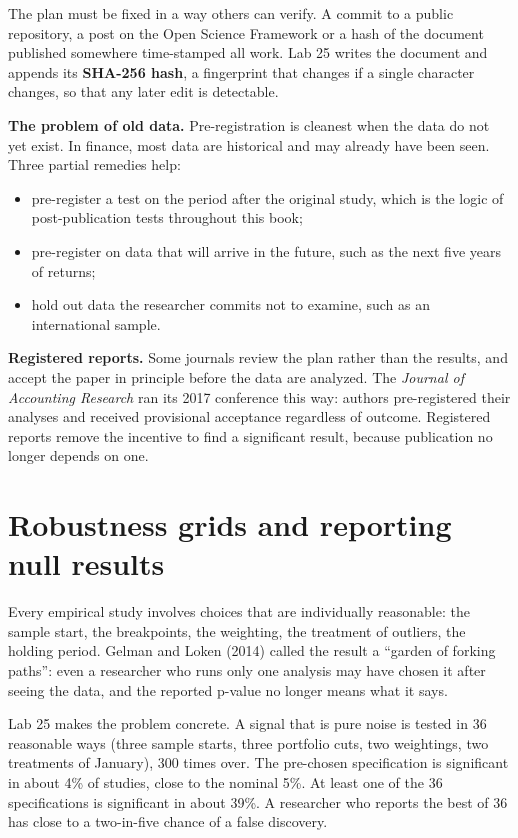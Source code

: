 The plan must be fixed in a way others can verify. A commit to a public repository, a post on the Open Science Framework or a hash of the document published somewhere time-stamped all work. Lab 25 writes the document and appends its \textbf{SHA-256 hash}, a fingerprint that changes if a single character changes, so that any later edit is detectable.

\textbf{The problem of old data.} Pre-registration is cleanest when the data do not yet exist. In finance, most data are historical and may already have been seen. Three partial remedies help:

\begin{itemize}
  \item pre-register a test on the period after the original study, which is the logic of post-publication tests throughout this book;
  \item pre-register on data that will arrive in the future, such as the next five years of returns;
  \item hold out data the researcher commits not to examine, such as an international sample.
\end{itemize}

\textbf{Registered reports.} Some journals review the plan rather than the results, and accept the paper in principle before the data are analyzed. The \emph{Journal of Accounting Research} ran its 2017 conference this way: authors pre-registered their analyses and received provisional acceptance regardless of outcome. Registered reports remove the incentive to find a significant result, because publication no longer depends on one.

\section{Robustness grids and reporting null results}
\label{sec:25-robust}

Every empirical study involves choices that are individually reasonable: the sample start, the breakpoints, the weighting, the treatment of outliers, the holding period. Gelman and Loken (2014) called the result a ``garden of forking paths'': even a researcher who runs only one analysis may have chosen it after seeing the data, and the reported p-value no longer means what it says.

Lab 25 makes the problem concrete. A signal that is pure noise is tested in 36 reasonable ways (three sample starts, three portfolio cuts, two weightings, two treatments of January), 300 times over. The pre-chosen specification is significant in about 4\% of studies, close to the nominal 5\%. At least one of the 36 specifications is significant in about 39\%. A researcher who reports the best of 36 has close to a two-in-five chance of a false discovery.

